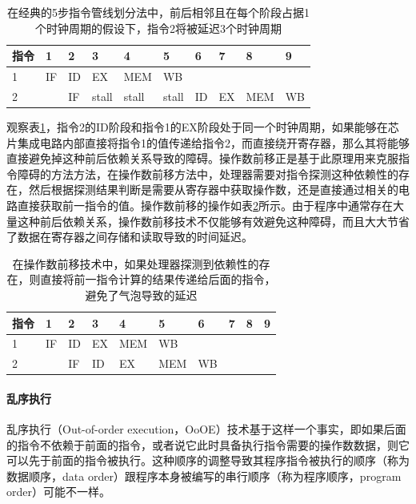 \begin{table}
\caption{在经典的5步指令管线划分法中，前后相邻且在每个阶段占据1个时钟周期的假设下，指令2将被延迟3个时钟周期}
\label{t:rp-pipeline-bubble}

\begin{tabular}{p{}|p{}|p{}|p{}|p{}|p{}|p{}|p{}|p{}|p{}}
\hline 
   指令&1&2&3&4&5&6&7&8&9  \\
    \hline  
 1&IF&ID&EX&MEM&WB&&&&\\
 2&&IF&stall&stall&stall&ID&EX&MEM&WB\\
 \hline 
\end{tabular}
\end{table}

观察表\ref{t:rp-pipeline-bubble}，指令2的ID阶段和指令1的EX阶段处于同一个时钟周期，如果能够在芯片集成电路内部直接将指令1的值传递给指令2，而直接绕开寄存器，那么其将能够直接避免掉这种前后依赖关系导致的障碍。操作数前移正是基于此原理用来克服指令障碍的方法方法，在操作数前移方法中，处理器需要对指令探测这种依赖性的存在，然后根据探测结果判断是需要从寄存器中获取操作数，还是直接通过相关的电路直接获取前一指令的值。操作数前移的操作如表\ref{t:rp-operand-forwarding}所示。由于程序中通常存在大量这种前后依赖关系，操作数前移技术不仅能够有效避免这种障碍，而且大大节省了数据在寄存器之间存储和读取导致的时间延迟。

\begin{table}
\caption{在操作数前移技术中，如果处理器探测到依赖性的存在，则直接将前一指令计算的结果传递给后面的指令，避免了气泡导致的延迟}
\label{t:rp-operand-forwarding}

\begin{tabular}{p{}|p{}|p{}|p{}|p{}|p{}|p{}|p{}|p{}|p{}}
\hline 
   指令&1&2&3&4&5&6&7&8&9  \\
    \hline  
 1&IF&ID&EX&MEM&WB&&&&\\
 2&&IF&ID&EX&MEM&WB&&&\\
 \hline 
\end{tabular}
\end{table}



\paragraph{乱序执行}
乱序执行（Out-of-order execution，OoOE）技术基于这样一个事实，即如果后面的指令不依赖于前面的指令，或者说它此时具备执行指令需要的操作数数据，则它可以先于前面的指令被执行。这种顺序的调整导致其程序指令被执行的顺序（称为数据顺序，data order）跟程序本身被编写的串行顺序（称为程序顺序，program order）可能不一样。

